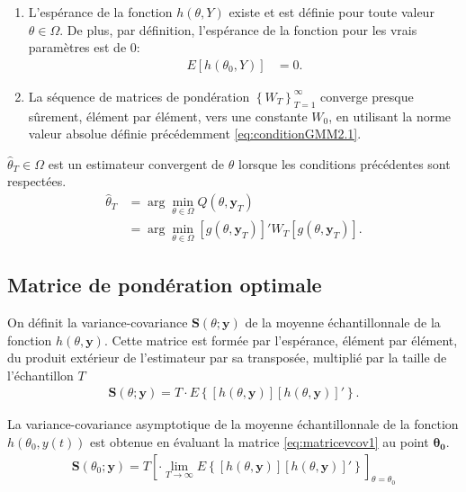 \begin{enumerate}
\item L'espérance de la fonction $h\left(\theta, Y \right)$ existe et
  est définie pour toute valeur $\theta \in \Omega$. De plus, par
  définition, l'espérance de la fonction pour les vrais paramètres est
  de 0:
  \begin{align*}
    E\left[h\left(\theta_0, Y \right)\right] &= 0.
  \end{align*}

\item La séquence de matrices de pondération $\left\{ W_T
  \right\}_{T=1}^{\infty}$ converge presque sûrement, élément par
  élément, vers une constante $W_0$, en utilisant la norme valeur
  absolue définie précédemment \eqref{eq:conditionGMM2.1}.
\end{enumerate}

$\hat\theta_T \in \Omega$ est un estimateur convergent de $\theta$
lorsque les conditions précédentes sont respectées.
\begin{align}
  \hat{\theta}_T &= \operatorname{arg}\min_{\theta\in\Omega} Q(\theta,\mathbf{y}_{T}) \nonumber\\
  &= \operatorname{arg}\min_{\theta\in\Omega}
  \left[g(\theta,\mathbf{y}_{T}) \right]' W_T
  \left[g(\theta,\mathbf{y}_{T}) \right]. \label{eq:estimateurGMM}
\end{align}

\subsection{Matrice de pondération optimale}
\label{sec:matriceWoptimaleGMM}

On définit la variance-covariance $\mathbf{S}(\theta;\mathbf{y})$ de
la moyenne échantillonnale de la fonction
$h(\theta,\mathbf{y})$. Cette matrice est formée par l'espérance,
élément par élément, du produit extérieur de l'estimateur par sa
transposée, multiplié par la taille de l'échantillon $T$
\begin{align}
  \label{eq:matricevcov1}
  \mathbf{S}(\theta;\mathbf{y}) = T \cdot E\left\{ \left[
      h(\theta,\mathbf{y})\right] \left[ h(\theta,\mathbf{y}) \right]'
  \right\} .
\end{align}

La variance-covariance asymptotique de la moyenne échantillonnale de
la fonction $h(\theta_0,y(t))$ est obtenue en évaluant la matrice
\eqref{eq:matricevcov1} au point $\mathbf{\theta_0}$.
\begin{align}
  \mathbf{S}(\theta_0;\mathbf{y}) = T \left[\cdot \lim_{T
      \longrightarrow \infty} E \left\{ \left[
        h(\theta,\mathbf{y})\right] \left[ h(\theta,\mathbf{y})
      \right]' \right\} \right]_{\theta=\theta_0}
\end{align}

